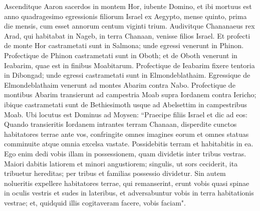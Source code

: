 \begin{biblechapter}
\verse Ascenditque Aaron sacerdos in montem Hor, iubente Domino, et ibi mortuus est anno quadragesimo egressionis filiorum Israel ex Aegypto, mense quinto, prima die mensis, 
\verse cum esset annorum centum viginti trium. 
\verse Audivitque Chananaeus rex Arad, qui habitabat in Nageb, in terra Chanaan, venisse filios Israel. 
\verse Et profecti de monte Hor castrametati sunt in Salmona; 
\verse unde egressi venerunt in Phinon. 
\verse Profectique de Phinon castrametati sunt in Oboth; 
\verse et de Oboth venerunt in Ieabarim, quae est in finibus Moabitarum. 
\verse Profectique de Ieabarim fixere tentoria in Dibongad; 
\verse unde egressi castrametati sunt in Elmondeblathaim. 
\verse Egressique de Elmondeblathaim venerunt ad montes Abarim contra Nabo. 
\verse Profectique de montibus Abarim transierunt ad campestria Moab supra Iordanem contra Iericho; 
\verse ibique castrametati sunt de Bethiesimoth usque ad Abelsettim in campestribus Moab. 
\verse Ubi locutus est Dominus ad Moysen: 
\verse “Praecipe filiis Israel et dic ad eos: Quando transieritis Iordanem intrantes terram Chanaan, 
\verse disperdite cunctos habitatores terrae ante vos, confringite omnes imagines eorum et omnes statuas comminuite atque omnia excelsa vastate. 
\verse Possidebitis terram et habitabitis in ea. Ego enim dedi vobis illam in possessionem, 
\verse quam dividetis inter tribus vestras. Maiori dabitis latiorem et minori angustiorem; singulis, ut sors ceciderit, ita tribuetur hereditas; per tribus et familias possessio dividetur. 
\verse Sin autem nolueritis expellere habitatores terrae, qui remanserint, erunt vobis quasi spinae in oculis vestris et sudes in lateribus, et adversabuntur vobis in terra habitationis vestrae; 
\verse et, quidquid illis cogitaveram facere, vobis faciam". 
\end{biblechapter}

